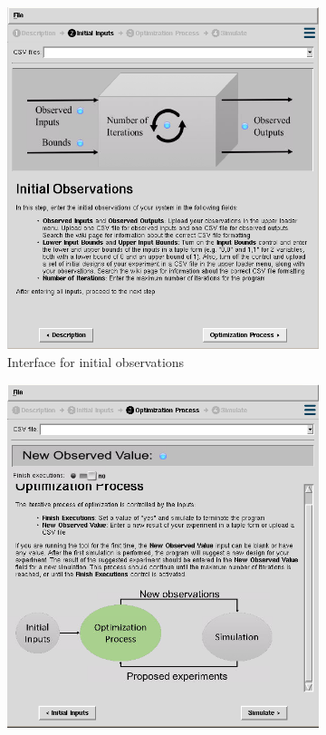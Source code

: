 \documentclass{article}
\begin{document}
\begin{figure}
\centering
    \begin{subfigure}{0.45\textwidth}
        \includegraphics[width=\textwidth]{tool1}
        \caption{Interface for initial observations}
        \label{tool_1}
    \end{subfigure}
    \hfill
    \begin{subfigure}{0.45\textwidth}
        \includegraphics[width=\textwidth]{tool2}

\end{subfigure}
\end{figure}
\end{document}

